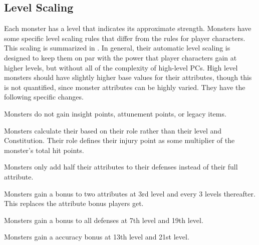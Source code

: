   \subsection{Level Scaling}
    Each monster has a level that indicates its approximate strength.
    Monsters have some specific level scaling rules that differ from the rules for player characters.
    This scaling is summarized in .
    In general, their automatic level scaling is designed to keep them on par with the power that player characters gain at higher levels, but without all of the complexity of high-level PCs.
    High level monsters should have slightly higher base values for their attributes, though this is not quantified, since monster attributes can be highly varied.
    They have the following specific changes.
    \begin{raggeditemize}
      \item Monsters do not gain insight points, attunement points, or legacy items.
      \item Monsters calculate their  based on their role rather than their level and Constitution.
        Their role defines their injury point as some multiplier of the monster's total hit points.
      \item Monsters only add half their attributes to their defenses instead of their full attribute.
      \item Monsters gain a  bonus to two attributes at 3rd level and every 3 levels thereafter.
        This replaces the attribute bonus players get.
      \item Monsters gain a  bonus to all defenses at 7th level and 19th level.
      \item Monsters gain a  accuracy bonus at 13th level and 21st level.
    \end{raggeditemize}

